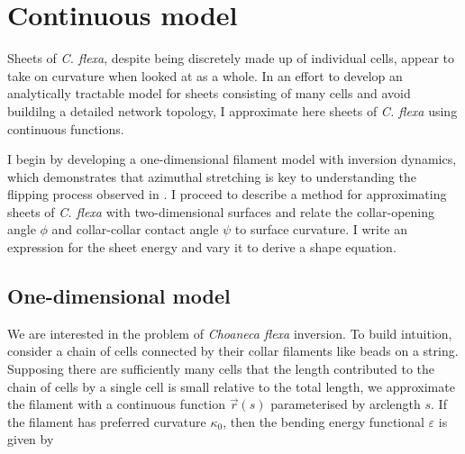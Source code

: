 
\chapter{Continuous model} \label{ch:2}

\ifpdf
    \graphicspath{{Chapter2/Figs/Raster/}{Chapter2/Figs/PDF/}{Chapter2/Figs/}}
\else
    \graphicspath{{Chapter2/Figs/Vector/}{Chapter2/Figs/}}
\fi

Sheets of \textit{C. flexa}, despite being discretely made up of individual cells, appear to take on curvature when looked at as a whole. 
In an effort to develop an analytically tractable model for sheets consisting of many cells and avoid buildilng a detailed network topology, I approximate here sheets of \textit{C. flexa} using continuous functions.

I begin by developing a one-dimensional filament model with inversion dynamics, which demonstrates that azimuthal stretching is key to understanding the flipping process observed in \citet{brunet2019}. 
I proceed to describe a method for approximating sheets of \textit{C. flexa} with two-dimensional surfaces and relate the collar-opening angle $\phi$ and collar-collar contact angle $\psi$ to surface curvature. 
I write an expression for the sheet energy and vary it to derive a shape equation.

\section{One-dimensional model} \label{sec:c_1d}


We are interested in the problem of \textit{Choaneca flexa} inversion. 
To build intuition, consider a chain of cells connected by their collar filaments like beads on a string. 
Supposing there are sufficiently many cells that the length contributed to the chain of cells by a single cell is small relative to the total length, we approximate the filament with a continuous function $\vec{r}(s)$ parameterised by arclength $s$.
If the filament has preferred curvature $\kappa_0$, then the bending energy functional $\varepsilon$ is given by 

